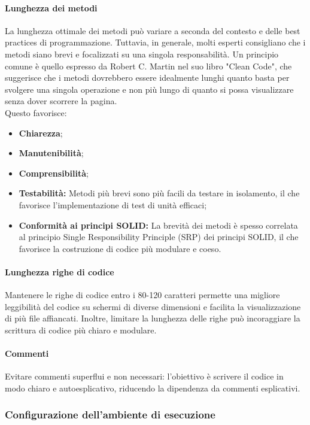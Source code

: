 \paragraph*{Lunghezza dei metodi}
La lunghezza ottimale dei metodi può variare a seconda del contesto e delle best practices di programmazione. Tuttavia, in generale, molti esperti consigliano che i metodi siano brevi e focalizzati su una singola responsabilità.
Un principio comune è quello espresso da Robert C. Martin nel suo libro "Clean Code", che suggerisce che i metodi dovrebbero essere idealmente lunghi quanto basta per svolgere una singola operazione e non più lungo di quanto si possa visualizzare senza dover scorrere la pagina. \\
Questo favorisce:
\begin{itemize}
    \item \textbf{Chiarezza};
    \item \textbf{Manutenibilità};
    \item \textbf{Comprensibilità};
    \item \textbf{Testabilità:} Metodi più brevi sono più facili da testare in isolamento, il che favorisce l'implementazione di test di unità efficaci;
    \item \textbf{Conformità ai principi SOLID:} La brevità dei metodi è spesso correlata al principio Single Responsibility Principle (SRP) dei principi SOLID, il che favorisce la costruzione di codice più modulare e coeso.
\end{itemize} 

\paragraph*{Lunghezza righe di codice}
Mantenere le righe di codice entro i 80-120 caratteri permette una migliore leggibilità del codice su schermi di diverse dimensioni e facilita la visualizzazione di più file affiancati.
Inoltre, limitare la lunghezza delle righe può incoraggiare la scrittura di codice più chiaro e modulare.
\paragraph{Commenti}
Evitare commenti superflui e non necessari: l'obiettivo è scrivere il codice in modo chiaro e autoesplicativo, riducendo la dipendenza da commenti esplicativi. 
\subsubsection{Configurazione dell'ambiente di esecuzione}
